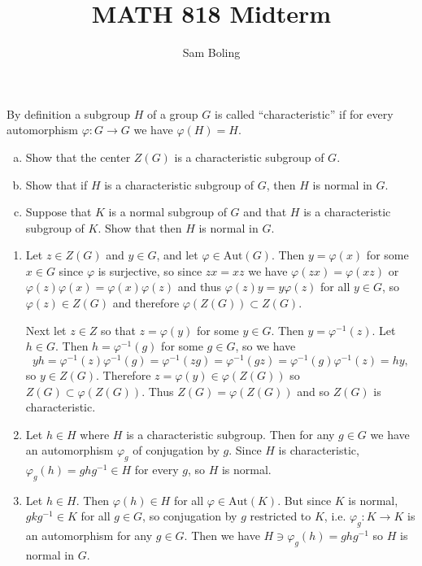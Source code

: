 \documentclass{article}
\title{MATH 818 Midterm}
\author{Sam Boling}
\newcounter{Problem}
\newenvironment{Problem}{\begin{Exercise}[name={Problem},
                                          counter={Problem}]}
                        {\end{Exercise}}
\begin{document}
\begin{Problem}
By definition a subgroup $H$ of a group $G$ is called
``characteristic'' if for every automorphism $\varphi : G \to G$ we
have $\varphi(H) = H$.
\begin{enumerate}[(a)]
  \item{Show that the center $Z(G)$ is a characteristic subgroup of
        $G$.
       }
  \item{Show that if $H$ is a characteristic subgroup of $G$, then $H$
        is normal in $G$.
       }
  \item{Suppose that $K$ is a normal subgroup of $G$ and that $H$ is a
        characteristic subgroup of $K$. Show that then $H$ is normal
        in $G$.
       }
\end{enumerate}
\end{Problem}

\begin{Answer}
\begin{enumerate}
  \item{
    Let $z \in Z(G)$ and $y \in G$, and let $\varphi \in
    \mathrm{Aut}(G)$.
    Then $y = \varphi(x)$ for some $x \in G$ since $\varphi$ is
    surjective, so since $zx = xz$ we have
    $\varphi(zx) = \varphi(xz)$ or
    $\varphi(z)\varphi(x) = \varphi(x)\varphi(z)$ and thus
    $\varphi(z)y = y \varphi(z)$ for all $y \in G$, so
    $\varphi(z) \in Z(G)$ and therefore
    $\varphi(Z(G)) \subset Z(G)$.

    Next let $z \in Z$ so that $z = \varphi(y)$ for some $y \in
    G$. Then $y = \varphi^{-1}(z)$. Let $h \in G$. Then
    $h = \varphi^{-1}(g)$ for some $g \in G$, so we have
    $$
    yh = \varphi^{-1}(z)\varphi^{-1}(g) = \varphi^{-1}(zg)
       = \varphi^{-1}(gz) = \varphi^{-1}(g)\varphi^{-1}(z) = hy,
    $$
    so $y \in Z(G)$. Therefore
    $z = \varphi(y) \in \varphi(Z(G))$ so
    $Z(G) \subset \varphi(Z(G))$. Thus $Z(G) = \varphi(Z(G))$ and so
    $Z(G)$ is characteristic.
  }
  \item{
    Let $h \in H$ where $H$ is a characteristic subgroup. Then for any
    $g \in G$ we have an automorphism $\varphi_g$ of conjugation by
    $g$. Since $H$ is characteristic,
    $\varphi_g(h) = ghg^{-1} \in H$ for every $g$, so $H$ is normal.
  }
  \item{
    Let $h \in H$. Then $\varphi(h) \in H$ for all
    $\varphi \in \mathrm{Aut}(K)$. But since $K$ is normal,
    $g k g^{-1} \in K$ for all $g \in G$, so conjugation by $g$
    restricted to $K$, i.e. $\varphi_g : K \to K$ is an automorphism
    for any $g \in G$. Then we have
    $H \ni \varphi_g(h) = g h g^{-1}$ so $H$ is normal in $G$.
  }
\end{enumerate}
\end{Answer}
\end{document}
